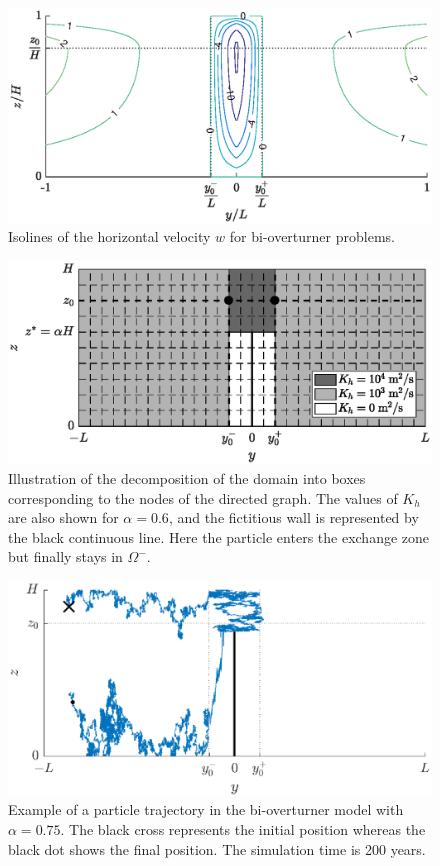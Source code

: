\begin{figure}[!htp]
	\centering
	\includegraphics[width=\textwidth]{fig/problem2box/w2box_timmermans.eps}
	\caption{Isolines of the horizontal velocity $w$ for bi-overturner problems.}
	\label{fig:w2box}
\end{figure}

\begin{figure}[!htp]
	\centering
	\includegraphics[width=\textwidth]{fig/problem2box/problem.eps}
	\caption{Illustration of the decomposition of the domain into boxes corresponding to the nodes of the directed graph. The values of $K_h$ are also shown for $\alpha = 0.6$, and the fictitious wall is represented by the black continuous line. Here the particle enters the exchange zone but finally stays in $\Omega^-$.}
	\label{fig:Kh2box}
\end{figure}

\begin{figure}[!htp]
	\centering
	\includegraphics[width=\textwidth]{fig/problem2box/traj_without_transfer5.eps}
	\caption{Example of a particle trajectory in the bi-overturner model with $\alpha = 0.75$. The black cross represents the initial position whereas the black dot shows the final position. The simulation time is 200 years.}
	\label{fig:withouttransfer}
\end{figure}

